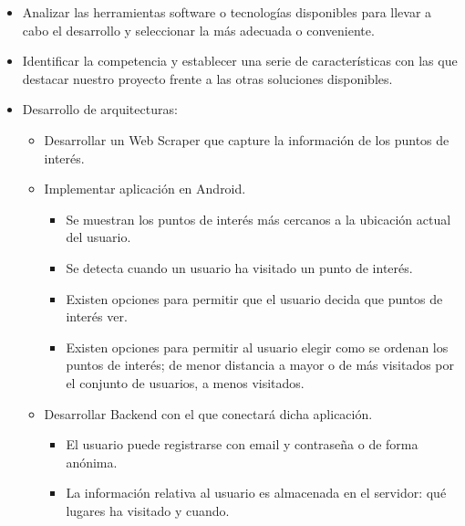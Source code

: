 \begin{itemize}

\item Analizar las herramientas software o tecnologías disponibles para llevar a cabo el desarrollo y seleccionar la más adecuada o conveniente.

\item Identificar la competencia y establecer una serie de características con las que destacar nuestro proyecto frente a las otras soluciones disponibles.

\item Desarrollo de arquitecturas:

    \begin{itemize}
    
    \item Desarrollar un Web Scraper que capture la información de los puntos de interés.
    
    \item Implementar aplicación en Android.
    
    
        \begin{itemize}
        
        \item Se muestran los puntos de interés más cercanos a la ubicación actual del usuario.
        
        \item Se detecta cuando un usuario ha visitado un punto de interés.
        
        \item Existen opciones para permitir que el usuario decida que puntos de interés ver.
        
        \item Existen opciones para permitir al usuario elegir como se ordenan los puntos de interés; de menor distancia a mayor o de más visitados por el conjunto de usuarios, a menos visitados.
        
        \end{itemize}
        
    
    \item Desarrollar Backend con el que conectará dicha aplicación.
    
        \begin{itemize}
            
        \item El usuario puede registrarse con email y contraseña o de forma anónima.
        
        \item La información relativa al usuario es almacenada en el servidor: qué lugares ha visitado y cuando.
        

\end{itemize}
\end{itemize}
\end{itemize}
